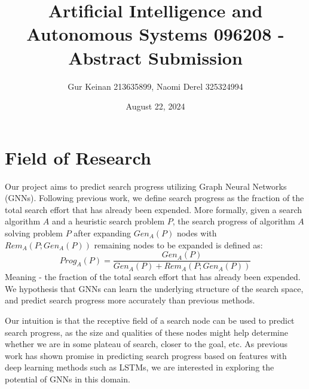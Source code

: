 \documentclass[12pt]{article}
\title{Artificial Intelligence and Autonomous Systems 096208 - Abstract Submission}
\author{Gur Keinan 213635899, Naomi Derel 325324994}
\date{August 22, 2024}
\newcommand{\naomi}[1]{{\color{red}{Naomi: #1}}}
\newcommand{\gur}[1]{{\color{blue}{Gur: #1}}}
\begin{document}
\maketitle

\section{Field of Research}

Our project aims to predict search progress utilizing Graph Neural Networks (GNNs). Following previous work, we define search progress as the fraction of the total search effort that has already been expended. More formally, given a search algorithm $A$ and a heuristic search problem $P$, the search progress of algorithm $A$ solving problem $P$ after expanding $Gen_A(P)$ nodes with $Rem_A(P; Gen_A(P))$ remaining nodes to be expanded is defined as:
\begin{equation}
  Prog_A(P) = \frac{Gen_A(P)}{Gen_A(P) + Rem_A(P; Gen_A(P))}
\end{equation}
Meaning - the fraction of the total search effort that has already been expended. \\

We hypothesis that GNNs can learn the underlying structure of the search space, and predict search progress more accurately than previous methods.

Our intuition is that the receptive field of a search node can be used to predict search progress, as the size and qualities of these nodes might help determine whether we are in some plateau of search, closer to the goal, etc. As previous work has shown promise in predicting search progress based on features with deep learning methods such as LSTMs, we are interested in exploring the potential of GNNs in this domain.

\end{document}
